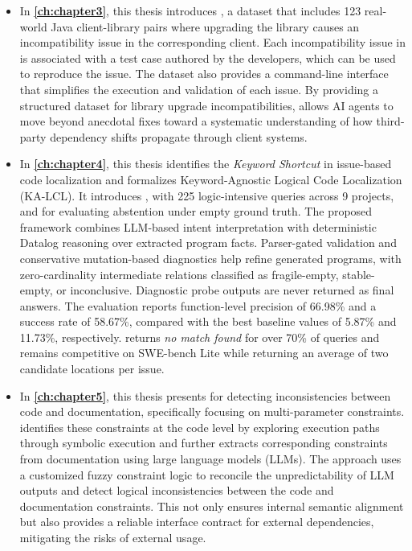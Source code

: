\begin{itemize}
    \item In \hyperref[ch:chapter3]{\underline{\textbf{\cref{ch:chapter3}}}}, this thesis introduces \toolcompsuite,  a dataset that includes 123 real-world Java client-library pairs where upgrading the library causes an incompatibility issue in the corresponding client. Each incompatibility issue in \toolcompsuite is associated with a test case authored by the developers, which can be used to reproduce the issue. The dataset also provides a command-line interface that simplifies the execution and validation of each issue. By providing a structured dataset for library upgrade incompatibilities, \toolcompsuite allows AI agents to move beyond anecdotal fixes toward a systematic understanding of how third-party dependency shifts propagate through client systems.    
    \item In \hyperref[ch:chapter4]{\underline{\textbf{\cref{ch:chapter4}}}}, this thesis identifies the \textit{Keyword Shortcut} in issue-based code localization and formalizes Keyword-Agnostic Logical Code Localization (KA-LCL). It introduces \dataset, with 225 logic-intensive queries across 9 projects, and \negset for evaluating abstention under empty ground truth. The proposed \tooldataloc framework combines LLM-based intent interpretation with deterministic Datalog reasoning over extracted program facts. Parser-gated validation and conservative mutation-based diagnostics help refine generated programs, with zero-cardinality intermediate relations classified as fragile-empty, stable-empty, or inconclusive. Diagnostic probe outputs are never returned as final answers. The evaluation reports function-level precision of 66.98\% and a success rate of 58.67\%, compared with the best baseline values of 5.87\% and 11.73\%, respectively. \tooldataloc returns \textit{no match found} for over 70\% of \negset queries and remains competitive on SWE-bench Lite while returning an average of two candidate locations per issue.
    
    \item In \hyperref[ch:chapter5]{\underline{\textbf{\cref{ch:chapter5}}}}, this thesis presents \toolchecker for detecting inconsistencies between code and documentation, specifically focusing on multi-parameter constraints. \toolchecker identifies these constraints at the code level by exploring execution paths through symbolic execution and further extracts corresponding constraints from documentation using large language models (LLMs). The approach uses a customized fuzzy constraint logic to reconcile the unpredictability of LLM outputs and detect logical inconsistencies between the code and documentation constraints. This not only ensures internal semantic alignment but also provides a reliable interface contract for external dependencies, mitigating the risks of external usage.
\end{itemize}

